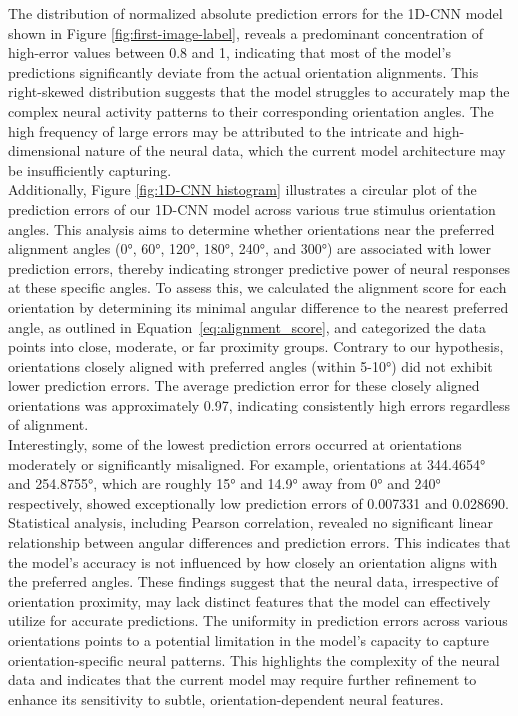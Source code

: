 \documentclass[a4paper]{article}
\begin{document}
\noindent The distribution of normalized absolute prediction errors for the 1D-CNN model shown in Figure \ref{fig:first-image-label}, reveals a predominant concentration of high-error values between 0.8 and 1, indicating that most of the model's predictions significantly deviate from the actual orientation alignments. This right-skewed distribution suggests that the model struggles to accurately map the complex neural activity patterns to their corresponding orientation angles. The high frequency of large errors may be attributed to the intricate and high-dimensional nature of the neural data, which the current model architecture may be insufficiently capturing.\\

\noindent Additionally, Figure \ref{fig:1D-CNN histogram} illustrates a circular plot of the prediction errors of our 1D-CNN model across various true stimulus orientation angles. This analysis aims to determine whether orientations near the preferred alignment angles (0°, 60°, 120°, 180°, 240°, and 300°) are associated with lower prediction errors, thereby indicating stronger predictive power of neural responses at these specific angles. To assess this, we calculated the alignment score for each orientation by determining its minimal angular difference to the nearest preferred angle, as outlined in Equation~\ref{eq:alignment_score},  and categorized the data points into close, moderate, or far proximity groups. Contrary to our hypothesis, orientations closely aligned with preferred angles (within 5-10°) did not exhibit lower prediction errors. The average prediction error for these closely aligned orientations was approximately 0.97, indicating consistently high errors regardless of alignment.\\

\noindent Interestingly, some of the lowest prediction errors occurred at orientations moderately or significantly misaligned. For example, orientations at 344.4654° and 254.8755°, which are roughly 15° and 14.9° away from 0° and 240° respectively, showed exceptionally low prediction errors of 0.007331 and 0.028690. Statistical analysis, including Pearson correlation, revealed no significant linear relationship between angular differences and prediction errors. This indicates that the model’s accuracy is not influenced by how closely an orientation aligns with the preferred angles. These findings suggest that the neural data, irrespective of orientation proximity, may lack distinct features that the model can effectively utilize for accurate predictions. The uniformity in prediction errors across various orientations points to a potential limitation in the model's capacity to capture orientation-specific neural patterns. This highlights the complexity of the neural data and indicates that the current model may require further refinement to enhance its sensitivity to subtle, orientation-dependent neural features.\\
\end{document}
